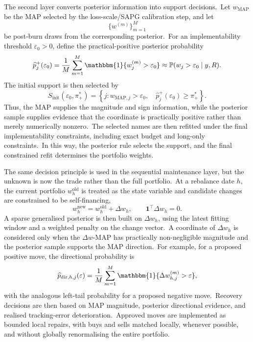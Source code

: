 \documentclass[11pt]{article}
\newcommand{\one}{\mathbf{1}}
\newcommand{\wold}{w^{\mathrm{old}}}
\newcommand{\wnew}{w^{\mathrm{new}}}
\newcommand{\wmap}{w_{\mathrm{MAP}}}
\newcommand{\epsinit}{\varepsilon_0}
\begin{document}
The second layer converts posterior information into support decisions.\ Let \(\wmap\) be the MAP selected by the loss-scale/SAPG calibration step, and let
\[
  \{w^{(m)}\}_{m=1}^M\]
be post-burn draws from the corresponding posterior.\ For an implementability threshold \(\epsinit>0\), define the practical-positive posterior probability
\begin{equation}
  \widehat p_j^+(\epsinit)
  =
  \frac1M\sum_{m=1}^M
  \mathbbm{1}\{w_j^{(m)} > \epsinit\}
  \approx
  \mathbb{P}(w_j>\epsinit\mid y,R).
  \label{eq:method-practical-positive}
\end{equation}
The initial support is then selected by
\begin{equation}
  S_{\mathrm{init}}(\epsinit,\pi_+^*)
  =
  \left\{
    j:
    w_{\mathrm{MAP},j}>\epsinit,
    \quad
    \widehat p_j^+(\epsinit)\geq \pi_+^*
  \right\}.
  \label{eq:method-support-rule}
\end{equation}
Thus, the MAP supplies the magnitude and sign information, while the posterior sample supplies evidence that the coordinate is practically positive rather than merely numerically nonzero.\ The selected names are then refitted under the final implementability constraints, including exact budget and long-only constraints.\ In this way, the posterior rule selects the support, and the final constrained refit determines the portfolio weights.

The same decision principle is used in the sequential maintenance layer, but the unknown is now the trade rather than the full portfolio.\ At a rebalance date \(h\), the current portfolio \(\wold_h\) is treated as the state variable and candidate changes are constrained to be self-financing,
\begin{equation}
  \wnew_h = \wold_h + \Delta w_h,
  \qquad
  \one^\top \Delta w_h = 0.
  \label{eq:method-self-financing-trade}
\end{equation}
A sparse generalised posterior is then built on \(\Delta w_h\), using the latest fitting window and a weighted penalty on the change vector.\ A coordinate of \(\Delta w_h\) is considered only when the \(\Delta w\)-MAP has practically non-negligible magnitude and the posterior sample supports the MAP direction.\ For example, for a proposed positive move, the directional probability is
\begin{equation}
  \widehat p_{\mathrm{dir},h,j}(\varepsilon)
  =
  \frac1M\sum_{m=1}^M
  \mathbbm{1}\{\Delta w_{h,j}^{(m)} > \varepsilon\},
  \label{eq:method-directional-prob-positive}
\end{equation}
with the analogous left-tail probability for a proposed negative move.\ Recovery decisions are then based on MAP magnitude, posterior directional evidence, and realised tracking-error deterioration.\ Approved moves are implemented as bounded local repairs, with buys and sells matched locally, whenever possible, and without globally renormalising the entire portfolio.
\end{document}
